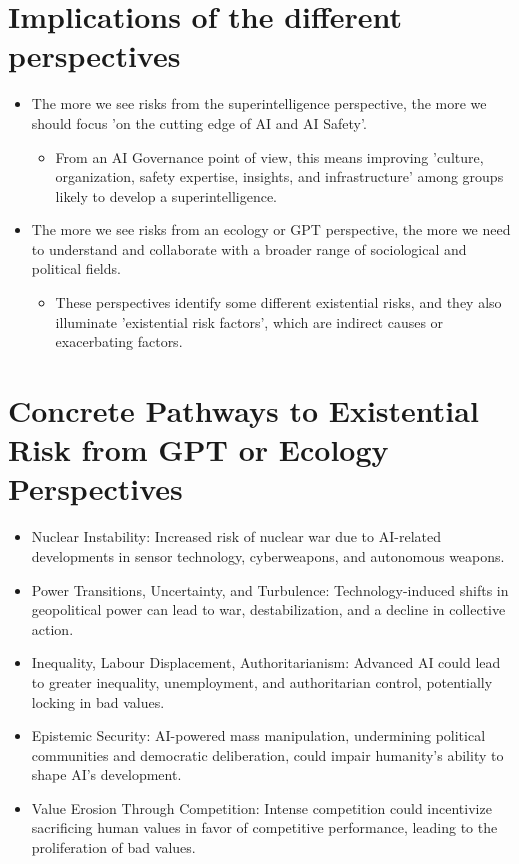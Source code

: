 \documentclass{article}
\begin{document}
\begin{multicols}{2}
\section{Implications of the different perspectives}
\begin{itemize}
    \item The more we see risks from the superintelligence perspective, the more we should focus 'on the cutting edge of AI and AI Safety'.
    \begin{itemize}
        \item From an AI Governance point of view, this means improving 'culture, organization, safety expertise, insights, and infrastructure' among groups likely to develop a superintelligence.
    \end{itemize}
    \item The more we see risks from an ecology or GPT perspective, the more we need to understand and collaborate with a broader range of sociological and political fields.
    \begin{itemize}
        \item These perspectives identify some different existential risks, and they also illuminate 'existential risk factors', which are indirect causes or exacerbating factors.
    \end{itemize}
\end{itemize}

\section{Concrete Pathways to Existential Risk from GPT or Ecology Perspectives}
\begin{itemize}
    \item Nuclear Instability: Increased risk of nuclear war due to AI-related developments in sensor technology, cyberweapons, and autonomous weapons.
    \item Power Transitions, Uncertainty, and Turbulence: Technology-induced shifts in geopolitical power can lead to war, destabilization, and a decline in collective action.
    \item Inequality, Labour Displacement, Authoritarianism: Advanced AI could lead to greater inequality, unemployment, and authoritarian control, potentially locking in bad values.
    \item Epistemic Security: AI-powered mass manipulation, undermining political communities and democratic deliberation, could impair humanity's ability to shape AI's development.
    \item Value Erosion Through Competition: Intense competition could incentivize sacrificing human values in favor of competitive performance, leading to the proliferation of bad values.
\end{itemize}


\end{multicols}
\end{document}

